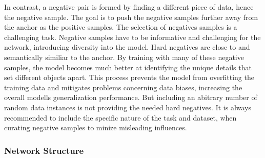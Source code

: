 In contrast, a negative pair is formed by finding a different piece of data, hence the negative sample. 
The goal is to push the negative samples further away from the anchor as the positive samples.
The selection of negatives samples is a challenging task.
Negative samples have to be informative and challenging for the network, introducing diversity into the model.
Hard negatives are close to and semantically similiar to the anchor.  
By training with many of these negative samples, the model becomes much better at identifying the unique details that set different objects apart.
This process prevents the model from overfitting the training data and mitigates problems concerning data biases, increasing the overall modells generalization performance.
But including an abitrary number of random data instances is not providing the needed hard negatives. 
It is always recommended to include the specific nature of the task and dataset, when curating negative samples to minize misleading influences. 




\subsubsection*{Network Structure}




